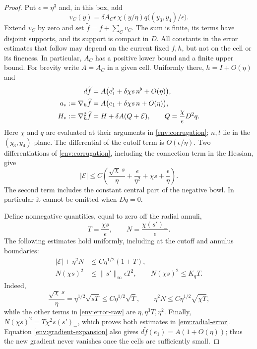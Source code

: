 \begin{proof}
Put $\epsilon=\eta^3$ and, in this box, add
\begin{equation}\label{env:corrugation}
 v_C(y)=\delta A_C\epsilon\,
       \chi(y/\eta)q\bigl((y_3,y_4)/\epsilon\bigr).
\end{equation}
Extend $v_C$ by zero and set $\widetilde f=f+\sum_Cv_C$. The sum
is finite, its terms have disjoint supports, and its support is compact
in $D$. All constants in the error estimates that follow may depend
on the current fixed $f,h$, but not on the cell or its fineness.
In particular, $A_C$ has a positive lower bound and a finite upper
bound. For brevity write $A=A_C$ in a given cell. Uniformly there,
$h=I+O(\eta)$ and
\begin{align}
 d\widetilde f
 &=A\bigl(e_1^\flat+\delta\chi s\,n^\flat+O(\eta)\bigr),
 \notag\\
 a_*:=\nabla_h\widetilde f
 &=A\bigl(e_1+\delta\chi s\,n+O(\eta)\bigr),
 \label{env:gradient-expansion}\\
 H_*:=\nabla_h^2\widetilde f
 &=H+\delta A(Q+\mathcal E),\qquad
 Q=\frac{\chi}{\epsilon}D^2q.
 \label{env:hessian-expansion}
\end{align}
Here $\chi$ and $q$ are evaluated at their arguments in
\eqref{env:corrugation}; $n,t$ lie in the $(y_3,y_4)$-plane.
The differential of the cutoff term is $O(\epsilon/\eta)$.
Two differentiations of \eqref{env:corrugation}, including the
connection term in the Hessian, give
\begin{equation}\label{env:error-raw}
 |\mathcal E|\le C\left(
  \frac{\sqrt\chi\,s}{\eta}+\frac{\epsilon}{\eta^2}
              +\chi s+\frac{\epsilon}{\eta}\right).
\end{equation}
The second term includes the constant central part of the negative
bowl. In particular it cannot be omitted when $Dq=0$.

Define nonnegative quantities, equal to zero off the radial annuli,
\[
 T=\frac{\chi s}{\epsilon},\qquad
 N=\frac{\chi(s')_-}{\epsilon}.
\]
The following estimates hold uniformly, including at the cutoff and
annulus boundaries:
\begin{align}
 |\mathcal E|+\eta^2N
 &\le C\eta^{1/2}(1+T),\label{env:error-uniform}\\
 N(\chi s)^2
 &\le\|s'\|_\infty\epsilon T^2,
 \qquad N(\chi s)^2\le K_qT.
 \label{env:radial-error}
\end{align}
Indeed,
\[
 \frac{\sqrt\chi\,s}{\eta}
   =\eta^{1/2}\sqrt{sT}\le C\eta^{1/2}\sqrt T,
 \qquad
 \eta^2N\le C\eta^{1/2}\sqrt{\chi T},
\]
while the other terms in \eqref{env:error-raw} are
$\eta,\eta^3T,\eta^2$. Finally,
$N(\chi s)^2=T\chi^2s(s')_-$, which proves both estimates in
\eqref{env:radial-error}. Equation \eqref{env:gradient-expansion}
also gives $d\widetilde f(e_1)=A(1+O(\eta))$; thus the new
gradient never vanishes once the cells are sufficiently small.


\end{proof}
